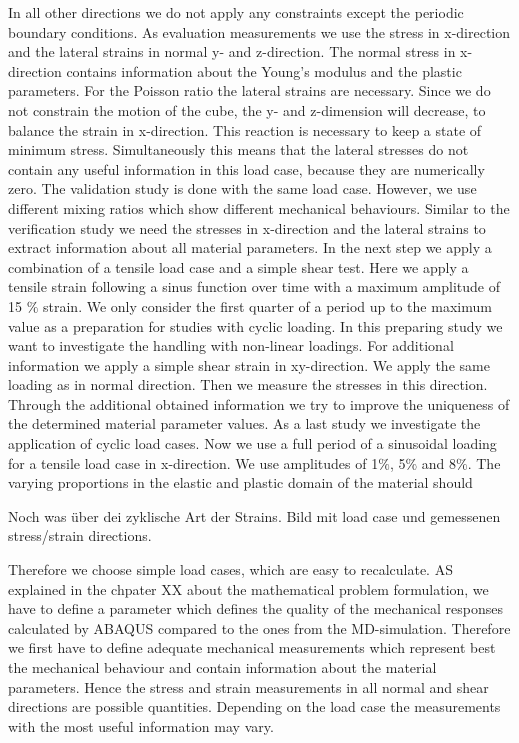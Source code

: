     In all other directions we do not apply any constraints except the periodic boundary conditions. As evaluation measurements we use the stress in x-direction and the lateral strains in normal y- and z-direction. The normal stress in x-direction contains information about the Young's modulus and the plastic parameters. For the Poisson ratio the lateral strains are necessary. Since we do not constrain the motion of the cube, the y- and z-dimension will decrease, to balance the strain in x-direction. This reaction is necessary to keep a state of minimum stress. Simultaneously this means that the lateral stresses do not contain any useful information in this load case, because they are numerically zero. 
    The validation study is done with the same load case. However, we use different mixing ratios which show different mechanical behaviours. Similar to the verification study we need the stresses in x-direction and the lateral strains to extract information about all material parameters. 
    In the next step we apply a combination of a tensile load case and a simple shear test. Here we apply a tensile strain following a sinus function over time with a maximum amplitude of 15 \(\%\) strain. We only consider the first quarter of a period up to the maximum value as a preparation for studies with cyclic loading. In this preparing study we want to investigate the handling with non-linear loadings. For additional information we apply a simple shear strain in xy-direction. We apply the same loading as in normal direction. Then we measure the stresses in this direction. Through the additional obtained information we try to improve the uniqueness of the determined material parameter values.
    As a last study we investigate the application of cyclic load cases. Now we use a full period of a sinusoidal loading for a tensile load case in x-direction. We use amplitudes of 1\(\%\), 5\(\%\) and 8\(\%\). The varying proportions in the elastic and plastic domain of the material should 
    
    Noch was über dei zyklische Art der Strains. Bild mit load case und gemessenen stress/strain directions.

    
    Therefore we choose simple load cases, which are easy to recalculate. AS explained in the chpater XX about the mathematical problem formulation, we have to define a parameter which defines the quality of the mechanical responses calculated by ABAQUS compared to the ones from the MD-simulation. Therefore we first have to define adequate mechanical measurements which represent best the mechanical behaviour and contain information about the material parameters. Hence the stress and strain measurements in all normal and shear directions are possible quantities. Depending on the load case the measurements with the most useful information may vary.

